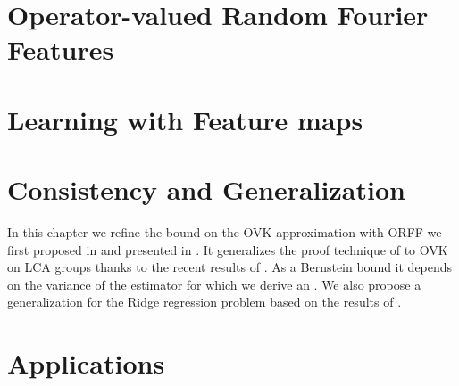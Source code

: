 
\chapter{Operator-valued Random Fourier Features}
\label{ch:operator-valued_random_fourier_features}


\chapter{Learning with Feature maps}
\label{ch:learning operator-valued_random_fourier_features}


\chapter{Consistency and Generalization} %
\label{ch:concistency_and_generalization}
\bigskip
\begin{justify}
In this chapter we refine the bound on the \ac{OVK} approximation with
\ac{ORFF} we first proposed in \cite{brault2016random} and presented in
\cite{braultborne}. It generalizes the proof technique of \citet{Rahimi2007} to
\ac{OVK} on \ac{LCA} groups thanks to the recent results of
\citet{sutherland2015, minh2016operator, tropp2015introduction,
minsker2011some, koltchinskii2013remark}. As a Bernstein bound it depends on
the variance of the estimator for which we derive an . We
also propose a generalization for the Ridge regression problem based on the
results of \citet{rahimi2009weighted, maurer2016vector}.
\end{justify}
\minitoc


\chapter{Applications} %
\label{ch:applications}

